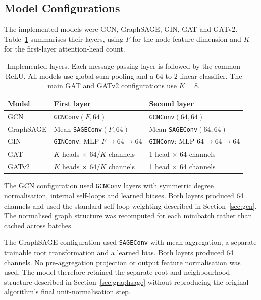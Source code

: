 \documentclass[11pt,a4paper]{article}
\begin{document}
\subsection{Model Configurations}
\label{sec:model-configurations}

The implemented models were GCN, GraphSAGE, GIN, GAT and GATv2. Table~\ref{tab:architectures} summarises their layers, using \(F\) for the node-feature dimension and \(K\) for the first-layer attention-head count.

\begin{table}[!ht]
\centering
\caption{Implemented layers. Each message-passing layer is followed by the common ReLU. All models use global sum pooling and a \(64\)-to-\(2\) linear classifier. The main GAT and GATv2 configurations use \(K=8\).}
\label{tab:architectures}
\small
\begin{tabular}{@{}lll@{}}
\toprule
Model & First layer & Second layer\\
\midrule
GCN & \texttt{GCNConv}\((F,64)\) & \texttt{GCNConv}\((64,64)\)\\
GraphSAGE & Mean \texttt{SAGEConv}\((F,64)\) & Mean \texttt{SAGEConv}\((64,64)\)\\
GIN & \texttt{GINConv}: MLP \(F\to64\to64\) & \texttt{GINConv}: MLP \(64\to64\to64\)\\
GAT & \(K\) heads \(\times\) \(64/K\) channels & 1 head \(\times\) 64 channels\\
GATv2 & \(K\) heads \(\times\) \(64/K\) channels & 1 head \(\times\) 64 channels\\
\bottomrule
\end{tabular}
\end{table}

The GCN configuration used \texttt{GCNConv} layers with symmetric degree normalisation, internal self-loops and learned biases. Both layers produced 64 channels and used the standard self-loop weighting described in Section~\ref{sec:gcn}. The normalised graph structure was recomputed for each minibatch rather than cached across batches.

The GraphSAGE configuration used \texttt{SAGEConv} with mean aggregation, a separate trainable root transformation and a learned bias. Both layers produced 64 channels. No pre-aggregation projection or output feature normalisation was used. The model therefore retained the separate root-and-neighbourhood structure described in Section~\ref{sec:graphsage} without reproducing the original algorithm's final unit-normalisation step.
\end{document}
